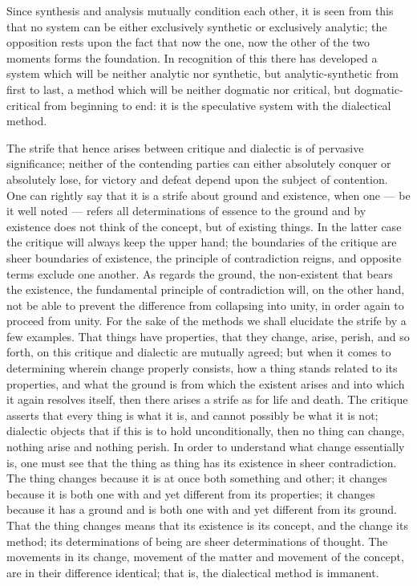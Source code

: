 \documentclass[12pt]{book}
\begin{document}
Since synthesis and analysis mutually condition each other, it is seen from this
that no system can be either exclusively synthetic or exclusively analytic; the
opposition rests upon the fact that now the one, now the other of the two
moments forms the foundation. In recognition of this there has developed a
system which will be neither analytic nor synthetic, but analytic-synthetic from
first to last, a method which will be neither dogmatic nor critical, but
dogmatic-critical from beginning to end: it is the speculative system with the
dialectical method.

The strife that hence arises between critique and dialectic is of pervasive
significance; neither of the contending parties can either absolutely conquer or
absolutely lose, for victory and defeat depend upon the subject of contention.
One can rightly say that it is a strife about ground and existence, when one ---
be it well noted --- refers all determinations of essence to the ground and by
existence does not think of the concept, but of existing things. In the latter
case the critique will always keep the upper hand; the boundaries of the
critique are sheer boundaries of existence, the principle of contradiction
reigns, and opposite terms exclude one another. As regards the ground, the
non-existent that bears the existence, the fundamental principle of
contradiction will, on the other hand, not be able to prevent the difference
from collapsing into unity, in order again to proceed from unity. For the sake
of the methods we shall elucidate the strife by a few examples. That things have
properties, that they change, arise, perish, and so forth, on this critique and
dialectic are mutually agreed; but when it comes to determining wherein change
properly consists, how a thing stands related to its properties, and what the
ground is from which the existent arises and into which it again resolves
itself, then there arises a strife as for life and death. The critique asserts
that every thing is what it is, and cannot possibly be what it is not; dialectic
objects that if this is to hold unconditionally, then no thing can change,
nothing arise and nothing perish. In order to understand what change essentially
is, one must see that the thing as thing has its existence in sheer
contradiction. The thing changes because it is at once both something and other;
it changes because it is both one with and yet different from its properties; it
changes because it has a ground and is both one with and yet different from its
ground. That the thing changes means that its existence is its concept, and the
change its method; its determinations of being are sheer determinations of
thought. The movements in its change, movement of the matter and movement of the
concept, are in their difference identical; that is, the dialectical method is
immanent.
\end{document}
